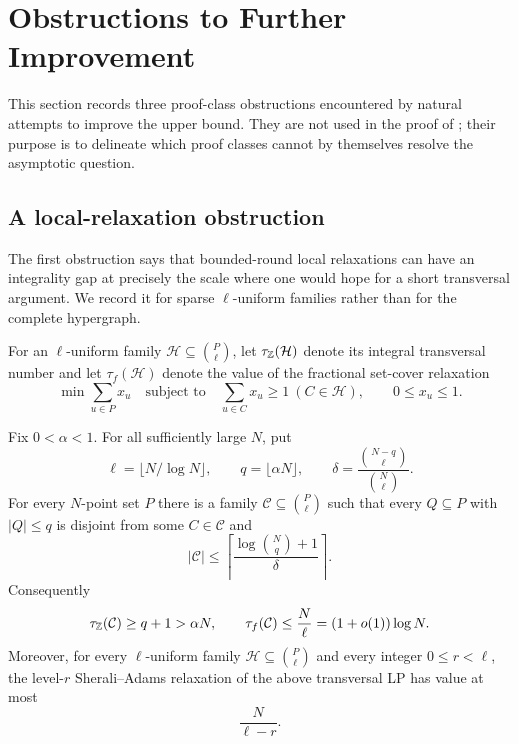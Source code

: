 \section{Obstructions to Further Improvement}\label{sec:obstructions}

This section records three proof-class obstructions encountered by natural attempts to improve
the upper bound.  They are not used in the proof of ; their
purpose is to delineate which proof classes cannot by themselves resolve the
asymptotic question.

\subsection{A local-relaxation obstruction}

The first obstruction says that bounded-round local relaxations can have an
integrality gap at precisely the scale where one would hope for a short
transversal argument.  We record it for sparse $\ell$-uniform families rather
than for the complete hypergraph.

For an $\ell$-uniform family $\mathcal H\subseteq\binom P\ell$, let
$\tau_{\mathbb{Z}}(\mathcal H)$ denote its integral transversal number and let
$\tau_f(\mathcal H)$ denote the value of the fractional set-cover relaxation
\[
  \min \sum_{u\in P}x_u
  \quad\text{subject to}\quad
  \sum_{u\in C}x_u\ge 1\ (C\in\mathcal H),\qquad 0\le x_u\le 1.
\]

\begin{proposition}\label{prop:sa-barrier}
Fix $0<\alpha<1$.  For all sufficiently large $N$, put
\[
  \ell=\lfloor N/\log N\rfloor,\qquad q=\lfloor \alpha N\rfloor,\qquad
  \delta=\frac{\binom{N-q}{\ell}}{\binom N\ell}.
\]
For every $N$-point set $P$ there is a family
$\mathcal C\subseteq\binom P\ell$ such that every
$Q\subseteq P$ with $|Q|\le q$ is disjoint from some $C\in\mathcal C$ and
\[
  |\mathcal C|\le
  \left\lceil\frac{\log\binom Nq+1}{\delta}\right\rceil .
\]
Consequently
\[
  \tau_{\mathbb{Z}}(\mathcal C)\ge q+1>\alpha N,
  \qquad
  \tau_f(\mathcal C)\le \frac N\ell=(1+o(1))\log N.
\]
Moreover, for every $\ell$-uniform family
$\mathcal H\subseteq\binom P\ell$ and every integer $0\le r<\ell$, the
level-$r$ Sherali--Adams \cite{SheraliAdams90} relaxation of the above
transversal LP has value at
most
\[
  \frac{N}{\ell-r}.
\]
\end{proposition}

